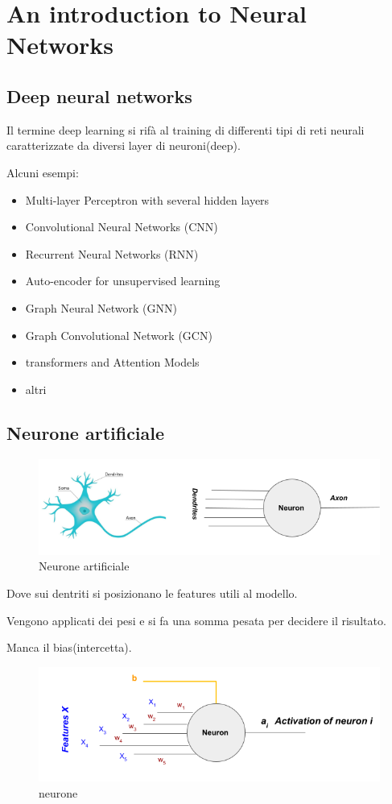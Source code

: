\section{An introduction to
Neural Networks}

\subsection{Deep neural networks}
Il termine deep learning si rifà al training di differenti tipi di reti neurali caratterizzate
da diversi layer di neuroni(deep).

Alcuni esempi:
\begin{itemize}
    \item Multi-layer Perceptron with several hidden layers
    \item Convolutional Neural Networks (CNN)
    \item Recurrent Neural Networks (RNN)
    \item Auto-encoder for unsupervised learning
    \item Graph Neural Network (GNN)
    \item Graph Convolutional Network (GCN)
    \item transformers and Attention Models
    \item altri
\end{itemize}

\subsection{Neurone artificiale}

\begin{figure}[H]
    \centering
    \includegraphics[width=0.5\linewidth]{imgs/neurone-artificale}
    \caption{Neurone artificiale}
    \label{fig:Neurone_artificiale}
\end{figure}

Dove sui dentriti si posizionano le features utili al modello.

Vengono applicati dei pesi e si fa una somma pesata per decidere il risultato.

Manca il bias(intercetta).
\begin{figure}[H]
    \centering
    \includegraphics[width=0.5\linewidth]{imgs/neurone}
    \caption{neurone}
    \label{fig:neurone}
\end{figure}

